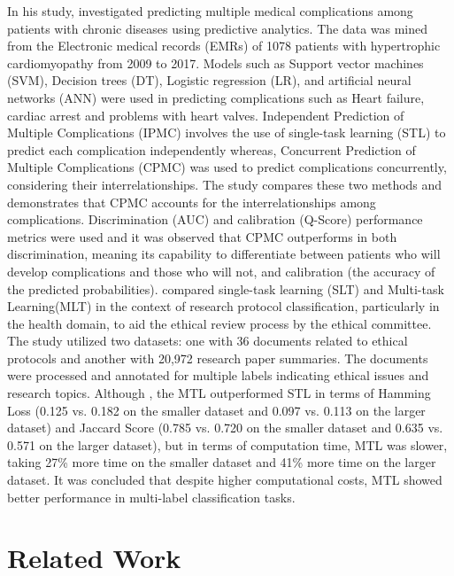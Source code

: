 In his study, \citet{talaei2019predictive} investigated predicting multiple medical complications among patients with chronic diseases using predictive analytics. The data was mined from the Electronic medical records (EMRs) of 1078 patients with hypertrophic cardiomyopathy from 2009 to 2017. Models such as Support vector machines (SVM),  Decision trees (DT), Logistic regression (LR), and artificial neural networks (ANN) were used in predicting complications such as Heart failure, cardiac arrest and problems with heart valves. Independent Prediction of Multiple Complications (IPMC) involves the use of single-task learning (STL) to predict each complication independently whereas, Concurrent Prediction of Multiple Complications (CPMC) was used to predict complications concurrently, considering their interrelationships. The study compares these two methods and demonstrates that CPMC accounts for the interrelationships among complications.  Discrimination (AUC) and calibration (Q-Score) performance metrics were used and it was observed that CPMC outperforms in both discrimination, meaning its capability to differentiate between patients who will develop complications and those who will not, and calibration (the accuracy of the predicted probabilities). 
\citet{abdillah2021comparative} compared single-task learning (SLT) and Multi-task Learning(MLT) in the context of research protocol classification, particularly in the health domain, to aid the ethical review process by the ethical committee. The study utilized two datasets: one with 36 documents related to ethical protocols and another with 20,972 research paper summaries. The documents were processed and annotated for multiple labels indicating ethical issues and research topics. Although , the  MTL outperformed STL in terms of Hamming Loss (0.125 vs. 0.182 on the smaller dataset and 0.097 vs. 0.113 on the larger dataset) and Jaccard Score (0.785 vs. 0.720 on the smaller dataset and 0.635 vs. 0.571 on the larger dataset), but in terms of computation time, MTL was slower, taking 27\% more time on the smaller dataset and 41\% more time on the larger dataset. It was concluded that despite higher computational costs, MTL showed better performance in multi-label classification tasks. 

\section{Related Work}

